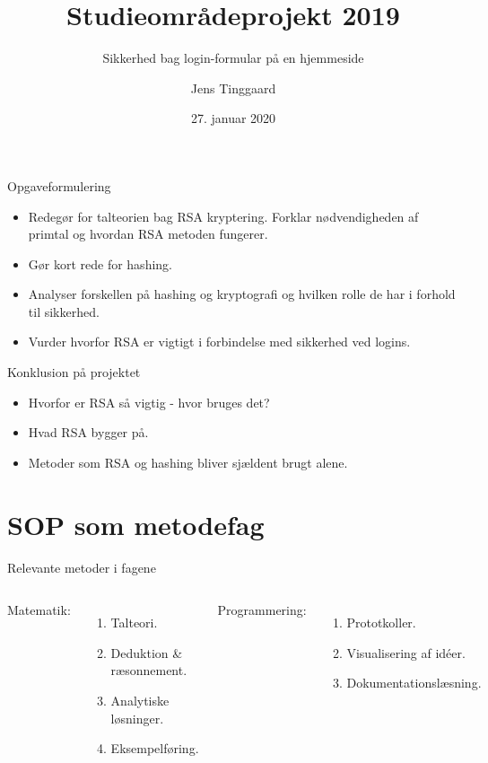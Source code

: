 \documentclass[10pt, aspectratio=169, usepdftitle=false]{beamer}
\title{Studieområdeprojekt 2019}
\subtitle{Sikkerhed bag login-formular på en hjemmeside}
\date{27. januar 2020}
\author{Jens Tinggaard}
\institute{Odense Tekniske Gymnasium}
\begin{document}
\maketitle


\begin{frame}{Opgaveformulering}
\begin{itemize}
    \large
    \item Redegør for talteorien bag RSA kryptering. Forklar nødvendigheden af primtal og hvordan RSA metoden fungerer.
    \item Gør kort rede for hashing.
    \item Analyser forskellen på hashing og kryptografi og hvilken rolle de har i forhold til sikkerhed.
    \item Vurder hvorfor RSA er vigtigt i forbindelse med sikkerhed ved logins.
\end{itemize}
\end{frame}

\begin{frame}{Konklusion på projektet}
    \begin{itemize}
        \large
        \item Hvorfor er RSA så vigtig - hvor bruges det?
        \item Hvad RSA bygger på.
        \item Metoder som RSA og hashing bliver sjældent brugt alene.
    \end{itemize}
\end{frame}

\section{SOP som metodefag}

\begin{frame}{Relevante metoder i fagene}
    \begin{columns}[T,onlytextwidth]
            \alert{Matematik:}
            \begin{enumerate}
                \item Talteori.
                \item Deduktion \& ræsonnement.
                \item Analytiske løsninger.
                \item Eksempelføring.
            \end{enumerate}
            \alert{Programmering:}
            \begin{enumerate}
                \item Prototkoller.
                \item Visualisering af id\'eer.
                \item Dokumentationslæsning.
            \end{enumerate}
    \end{columns}
\end{frame}
\end{document}
